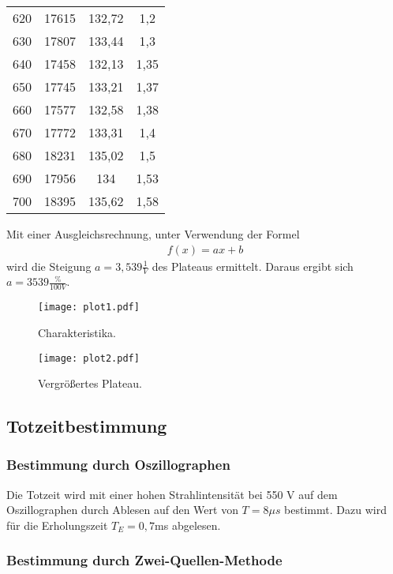 \begin{table}
\begin{tabular}{c c c c}
  620 & 17615 & 132,72 & 1,2 \\
  630 & 17807 & 133,44 & 1,3 \\
  640 & 17458 & 132,13 & 1,35 \\
  650 & 17745 & 133,21 & 1,37 \\
  660 & 17577 & 132,58 & 1,38 \\
  670 & 17772 & 133,31 & 1,4 \\
  680 & 18231 & 135,02 & 1,5 \\
  690 & 17956 & 134 & 1,53 \\
  700 & 18395 & 135,62 & 1,58 \\
  \bottomrule
\end{tabular}
\end{table}
\FloatBarrier

Mit einer Ausgleichsrechnung, unter Verwendung der Formel
\begin{align*}
  f(x)=ax+b
\end{align*}
wird die Steigung $a = 3,539 \frac{1}{V}$ des Plateaus ermittelt.
Daraus ergibt sich $a = 3539 \frac{\%}{100V}$.

\begin{figure}
  \centering
  \texttt{[image: plot1.pdf]}
  \caption{Charakteristika.}
  \label{fig:plot1}
\end{figure}
\FloatBarrier
\begin{figure}
  \centering
  \texttt{[image: plot2.pdf]}
  \caption{Vergrößertes Plateau.}
  \label{fig:plot2}
\end{figure}
\FloatBarrier

\subsection{Totzeitbestimmung}
\label{sec:totzeit}

\subsubsection{Bestimmung durch Oszillographen}
\label{sec:oszi}

Die Totzeit wird mit einer hohen Strahlintensität bei 550 V auf dem Oszillographen durch Ablesen auf den Wert von $T = 8 \mu s$ bestimmt.
Dazu wird für die Erholungszeit $T_E=0,7$ms abgelesen.

\subsubsection{Bestimmung durch Zwei-Quellen-Methode}
\label{sec:zwquellen}

